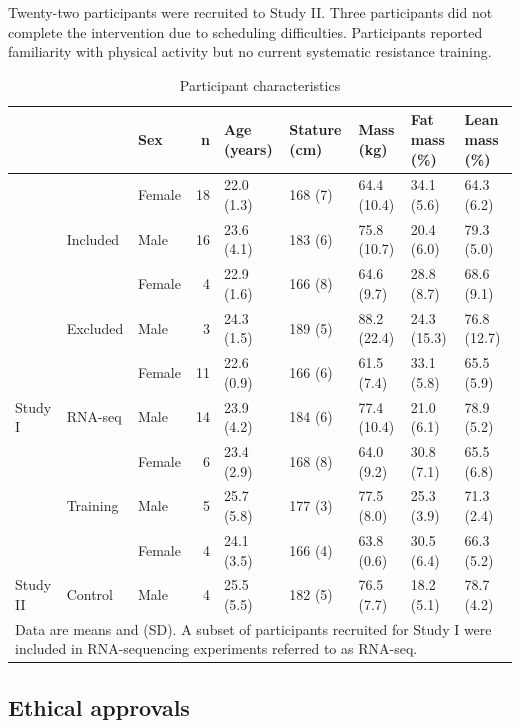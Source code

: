 \documentclass[twoside,10pt]{gihclass} %
\begin{document}
Twenty-two participants were recruited to Study II. Three participants did not complete the intervention due to scheduling difficulties. Participants reported familiarity with physical activity but no current systematic resistance training.
\begin{landscape}\begin{table}

\caption{\label{tab:characteristics-table}Participant characteristics}
\centering
\fontsize{7}{9}\selectfont
\begin{tabular}[t]{lllrlllll}
\toprule
  &   & Sex & n & Age (years) & Stature
(cm) & Mass (kg) & Fat mass (\%) & Lean mass (\%)\\
\midrule
 &  & Female & 18 & 22.0 (1.3) & 168 (7) & 64.4 (10.4) & 34.1 (5.6) & 64.3 (6.2)\\
\cmidrule{3-9}
 & \multirow{-2}{*}{\raggedright\arraybackslash Included} & Male & 16 & 23.6 (4.1) & 183 (6) & 75.8 (10.7) & 20.4 (6.0) & 79.3 (5.0)\\
\cmidrule{2-9}
 &  & Female & 4 & 22.9 (1.6) & 166 (8) & 64.6 (9.7) & 28.8 (8.7) & 68.6 (9.1)\\
\cmidrule{3-9}
 & \multirow{-2}{*}{\raggedright\arraybackslash Excluded} & Male & 3 & 24.3 (1.5) & 189 (5) & 88.2 (22.4) & 24.3 (15.3) & 76.8 (12.7)\\
\cmidrule{2-9}
 &  & Female & 11 & 22.6 (0.9) & 166 (6) & 61.5 (7.4) & 33.1 (5.8) & 65.5 (5.9)\\
\cmidrule{3-9}
\multirow{-6}{*}{\raggedright\arraybackslash Study I} & \multirow{-2}{*}{\raggedright\arraybackslash RNA-seq} & Male & 14 & 23.9 (4.2) & 184 (6) & 77.4 (10.4) & 21.0 (6.1) & 78.9 (5.2)\\
\cmidrule{1-9}
 &  & Female & 6 & 23.4 (2.9) & 168 (8) & 64.0 (9.2) & 30.8 (7.1) & 65.5 (6.8)\\
\cmidrule{3-9}
 & \multirow{-2}{*}{\raggedright\arraybackslash Training} & Male & 5 & 25.7 (5.8) & 177 (3) & 77.5 (8.0) & 25.3 (3.9) & 71.3 (2.4)\\
\cmidrule{2-9}
 &  & Female & 4 & 24.1 (3.5) & 166 (4) & 63.8 (0.6) & 30.5 (6.4) & 66.3 (5.2)\\
\cmidrule{3-9}
\multirow{-4}{*}{\raggedright\arraybackslash Study II} & \multirow{-2}{*}{\raggedright\arraybackslash Control} & Male & 4 & 25.5 (5.5) & 182 (5) & 76.5 (7.7) & 18.2 (5.1) & 78.7 (4.2)\\
\bottomrule
\multicolumn{9}{l}{\rule{0pt}{1em}Data are means and (SD). A subset of participants recruited for Study I were included in RNA-sequencing experiments referred to as RNA-seq.}\\
\end{tabular}
\end{table}
\end{landscape}
\hypertarget{ethical-approvals}{%
\subsection{Ethical approvals}\label{ethical-approvals}}
\end{document}
